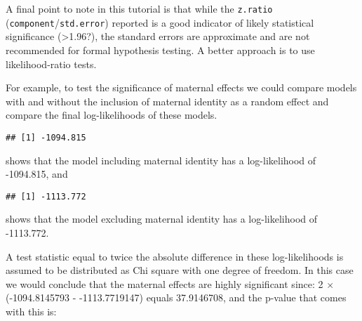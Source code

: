 \documentclass[
  12pt,
]{book}
\newenvironment{Shaded}{\begin{snugshade}}{\end{snugshade}}
\newcommand{\DecValTok}[1]{\textcolor[rgb]{0.00,0.00,0.81}{#1}}
\newcommand{\FunctionTok}[1]{\textcolor[rgb]{0.00,0.00,0.00}{#1}}
\newcommand{\NormalTok}[1]{#1}
\newcommand{\SpecialCharTok}[1]{\textcolor[rgb]{0.00,0.00,0.00}{#1}}
\begin{document}
A final point to note in this tutorial is that while the \texttt{z.ratio} (\texttt{component}/\texttt{std.error}) reported is a good indicator of likely statistical significance (\textgreater1.96?), the standard errors are approximate and are not recommended for formal hypothesis testing. A better approach is to use likelihood-ratio tests.

For example, to test the significance of maternal effects we could compare models with and without the inclusion of maternal identity as a random effect and compare the final log-likelihoods of these models.

\begin{Shaded}
\end{Shaded}

\begin{verbatim}
## [1] -1094.815
\end{verbatim}

shows that the model including maternal identity has a log-likelihood of -1094.815, and

\begin{Shaded}
\end{Shaded}

\begin{verbatim}
## [1] -1113.772
\end{verbatim}

shows that the model excluding maternal identity has a log-likelihood of -1113.772.

A test statistic equal to twice the absolute difference in these log-likelihoods is assumed to be distributed as Chi square with one degree of freedom. In this case we would conclude that the maternal effects are highly significant since:
2 \(\times\) (-1094.8145793 - -1113.7719147) equals 37.9146708, and the p-value that comes with this is:

\begin{Shaded}
\end{Shaded}
\end{document}
